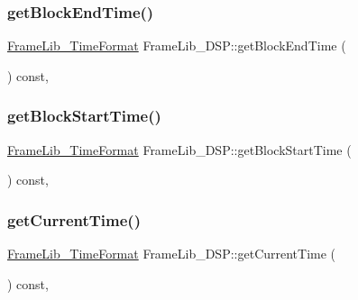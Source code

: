 \mbox{\label{class_frame_lib___d_s_p_a8cd169b635307807b29f1d02ea23635e}} 
\subsubsection{\texorpdfstring{get\+Block\+End\+Time()}{getBlockEndTime()}}
{\footnotesize\ttfamily \hyperlink{_frame_lib___types_8h_a699a4071a9eaaa283906a5ebd0a79ac0}{Frame\+Lib\+\_\+\+Time\+Format} Frame\+Lib\+\_\+\+D\+S\+P\+::get\+Block\+End\+Time (\begin{DoxyParamCaption}{ }\end{DoxyParamCaption}) const\hspace{0.3cm}{\ttfamily [inline]}, {\ttfamily [protected]}}

\mbox{\label{class_frame_lib___d_s_p_a9c34c56420ff9da196150e8a5307e812}} 
\subsubsection{\texorpdfstring{get\+Block\+Start\+Time()}{getBlockStartTime()}}
{\footnotesize\ttfamily \hyperlink{_frame_lib___types_8h_a699a4071a9eaaa283906a5ebd0a79ac0}{Frame\+Lib\+\_\+\+Time\+Format} Frame\+Lib\+\_\+\+D\+S\+P\+::get\+Block\+Start\+Time (\begin{DoxyParamCaption}{ }\end{DoxyParamCaption}) const\hspace{0.3cm}{\ttfamily [inline]}, {\ttfamily [protected]}}

\mbox{\label{class_frame_lib___d_s_p_a5734f973e603be4a85764d5f77fa4004}} 
\subsubsection{\texorpdfstring{get\+Current\+Time()}{getCurrentTime()}}
{\footnotesize\ttfamily \hyperlink{_frame_lib___types_8h_a699a4071a9eaaa283906a5ebd0a79ac0}{Frame\+Lib\+\_\+\+Time\+Format} Frame\+Lib\+\_\+\+D\+S\+P\+::get\+Current\+Time (\begin{DoxyParamCaption}{ }\end{DoxyParamCaption}) const\hspace{0.3cm}{\ttfamily [inline]}, {\ttfamily [protected]}}

